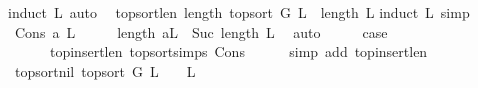 \begin{isabellebody}
%
\isadelimproof
%
\endisadelimproof
%
\isatagproof
{}\isamarkupfalse%
{\isacharparenleft}{\kern0pt}induct\ L{\isacharcomma}{\kern0pt}\ auto{\isacharparenright}{\kern0pt}\ \isamarkupfalse%
%
\endisatagproof
{\isafoldproof}%
%
\isadelimproof
\isanewline
%
\endisadelimproof
\isanewline
\isanewline
{}\isamarkupfalse%
\ top{\isacharunderscore}{\kern0pt}sort{\isacharunderscore}{\kern0pt}len{\isacharcolon}{\kern0pt}\ {\isachardoublequoteopen}length\ {\isacharparenleft}{\kern0pt}top{\isacharunderscore}{\kern0pt}sort\ G\ L{\isacharparenright}{\kern0pt}\ {\isacharequal}{\kern0pt}\ length\ L{\isachardoublequoteclose}\isanewline
%
\isadelimproof
%
\endisadelimproof
%
\isatagproof
{}\isamarkupfalse%
{\isacharparenleft}{\kern0pt}induct\ L{\isacharcomma}{\kern0pt}\ simp{\isacharparenright}{\kern0pt}\isanewline
\ \ \isamarkupfalse%
\ {\isacharparenleft}{\kern0pt}Cons\ a\ L{\isacharparenright}{\kern0pt}\isanewline
\ \ \isamarkupfalse%
\ \isamarkupfalse%
\ {\isachardoublequoteopen}length\ {\isacharparenleft}{\kern0pt}a{\isacharhash}{\kern0pt}L{\isacharparenright}{\kern0pt}\ {\isacharequal}{\kern0pt}\ Suc\ {\isacharparenleft}{\kern0pt}length\ L{\isacharparenright}{\kern0pt}{\isachardoublequoteclose}\ \isamarkupfalse%
\ auto\isanewline
\ \ \isamarkupfalse%
\ \isamarkupfalse%
\ {\isacharquery}{\kern0pt}case\ \isamarkupfalse%
\isanewline
\ \ \ \ \ \ top{\isacharunderscore}{\kern0pt}insert{\isacharunderscore}{\kern0pt}len\ top{\isacharunderscore}{\kern0pt}sort{\isachardot}{\kern0pt}simps{\isacharparenleft}{\kern0pt}{}{\isacharparenright}{\kern0pt}\ Cons\isanewline
\ \ \ \ \isamarkupfalse%
\ {\isacharparenleft}{\kern0pt}simp\ add{\isacharcolon}{\kern0pt}\ top{\isacharunderscore}{\kern0pt}insert{\isacharunderscore}{\kern0pt}len{\isacharparenright}{\kern0pt}\ \ \isanewline
{}\isamarkupfalse%
%
\endisatagproof
{\isafoldproof}%
%
\isadelimproof
\isanewline
%
\endisadelimproof
\isanewline
\isanewline
{}\isamarkupfalse%
\ top{\isacharunderscore}{\kern0pt}sort{\isacharunderscore}{\kern0pt}nil{\isacharcolon}{\kern0pt}\ {\isachardoublequoteopen}top{\isacharunderscore}{\kern0pt}sort\ G\ L\ {\isacharequal}{\kern0pt}\ {\isacharbrackleft}{\kern0pt}{\isacharbrackright}{\kern0pt}\ {\isasymlongleftrightarrow}\ L\ {\isacharequal}{\kern0pt}\ {\isacharbrackleft}{\kern0pt}{\isacharbrackright}{\kern0pt}{\isachardoublequoteclose}\ \isanewline
%
\isadelimproof
%
\endisadelimproof

\end{isabellebody}
